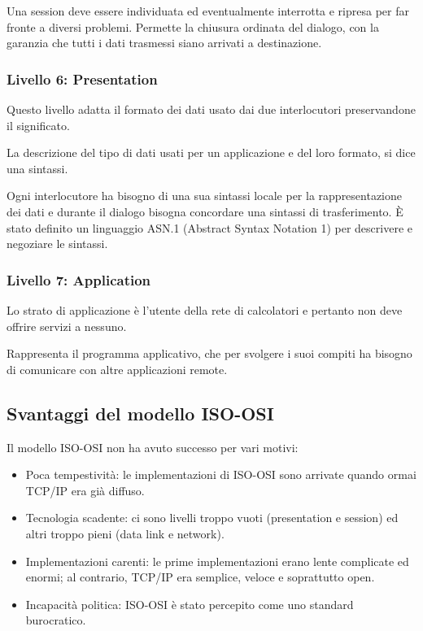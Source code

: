             Una session deve essere individuata ed eventualmente interrotta e ripresa per far fronte a diversi problemi. Permette la chiusura ordinata del dialogo, con la garanzia che tutti i dati trasmessi siano arrivati a destinazione.

        \subsubsection{Livello 6: Presentation}
            Questo livello adatta il formato dei dati usato dai due interlocutori preservandone il significato.
        
            La descrizione del tipo di dati usati per un applicazione e del loro formato, si dice una sintassi.
        
            Ogni interlocutore ha bisogno di una sua sintassi locale per la rappresentazione dei dati e durante il dialogo bisogna concordare una sintassi di trasferimento. È stato definito un linguaggio ASN.1 (Abstract Syntax Notation 1) per descrivere e negoziare le sintassi.
        
        \subsubsection{Livello 7: Application}
            Lo strato di applicazione è l'utente della rete di calcolatori e pertanto non deve offrire servizi a nessuno.
        
            Rappresenta il programma applicativo, che per svolgere i suoi compiti ha bisogno di comunicare con altre applicazioni remote.

    \newpage
        
    \subsection{Svantaggi del modello ISO-OSI}
        Il modello ISO-OSI non ha avuto successo per vari motivi:
        \begin{itemize}
            \item Poca tempestività: le implementazioni di ISO-OSI sono arrivate quando ormai TCP/IP era già diffuso.
            \item Tecnologia scadente: ci sono livelli troppo vuoti (presentation e session) ed altri troppo pieni (data link e network).
            \item Implementazioni carenti: le prime implementazioni erano lente complicate ed enormi; al contrario, TCP/IP era semplice, veloce e soprattutto open.
            \item Incapacità politica: ISO-OSI è stato percepito come uno standard burocratico.
        \end{itemize}

